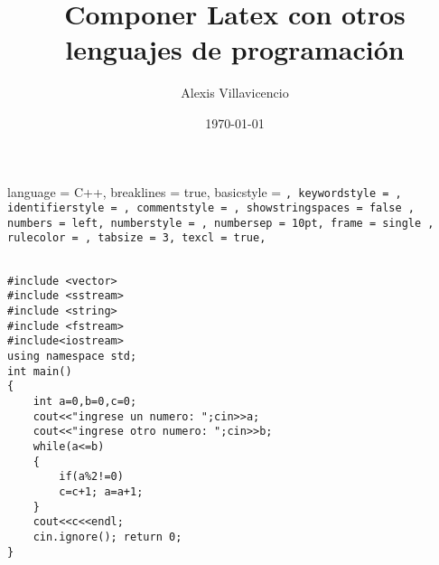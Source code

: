 \documentclass[a4paper,12pt]{article}
\title{Componer Latex con otros lenguajes de programación}
\author{Alexis Villavicencio}
\date{\today}
\begin{document}
\lstset
{
language = C++,
breaklines = true,
basicstyle = \tt\footnotesize ,
keywordstyle = \color{purple},
identifierstyle = \color{yellow},
commentstyle = \color{red},
showstringspaces = false ,
 numbers = left,
 numberstyle = \tiny\color{brown},
 numbersep = 10pt,
 frame = single ,
 rulecolor = \color{teal!20},
 tabsize = 3,
 texcl = true,
 }
 \begin{lstlisting}

#include <vector>
#include <sstream>
#include <string>
#include <fstream>
#include<iostream>
using namespace std;
int main()
{
    int a=0,b=0,c=0;
    cout<<"ingrese un numero: ";cin>>a;
    cout<<"ingrese otro numero: ";cin>>b;
    while(a<=b)
    {
        if(a%2!=0)
        c=c+1; a=a+1;       
    }
    cout<<c<<endl;
    cin.ignore(); return 0;
}
\end{lstlisting}
\end{document}
